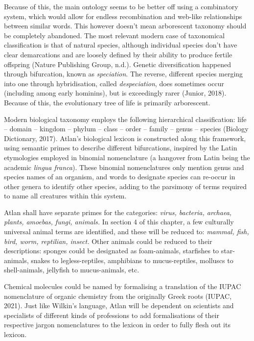 Because of this, the main ontology seems to be better off using a combinatory system, which would allow for endless recombination and web-like relationships between similar words. This however doesn’t mean arborescent taxonomy should be completely abandoned. The most relevant modern case of taxonomical classification is that of natural species, although individual species don’t have clear demarcations and are loosely defined by their ability to produce fertile offspring (Nature Publishing Group, n.d.). Genetic diversification happened through bifurcation, known as {\it speciation}. The reverse, different species merging into one through hybridisation, called {\it despeciation}, does sometimes occur (including among early hominins), but is exceedingly rarer (Junior, 2018). Because of this, the evolutionary tree of life is primarily arborescent. 

Modern biological taxonomy employs the following hierarchical classification: life – domain – kingdom – phylum – class – order – family – genus – species (Biology Dictionary, 2017). Atlan’s biological lexicon is constructed along this framework, using semantic primes to describe different bifurcations, inspired by the Latin etymologies employed in binomial nomenclature (a hangover from Latin being the academic {\it lingua franca}). These binomial nomenclatures only mention genus and species names of an organism, and words to designate species can re-occur in other genera to identify other species, adding to the parsimony of terms required to name all creatures within this system. 

Atlan shall have separate primes for the categories: \textit{virus, bacteria, archaea, plants, amoebas, fungi, animals.} In section 4 of this chapter, a few culturally universal animal terms are identified, and these will be reduced to: \textit{mammal, fish, bird, worm, reptilian, insect.} Other animals could be reduced to their descriptions: sponges could be designated as foam-animals, starfishes to star-animals, snakes to legless-reptiles, amphibians to mucus-reptiles, molluscs to shell-animals, jellyfish to mucus-animals, etc.  


Chemical molecules could be named by formalising a translation of the IUPAC nomenclature of organic chemistry from the originally Greek roots (IUPAC, 2021). Just like Wilkin’s language, Atlan will be dependent on scientists and specialists of different kinds of professions to add formalisations of their respective jargon nomenclatures to the lexicon in order to fully flesh out its lexicon. 

